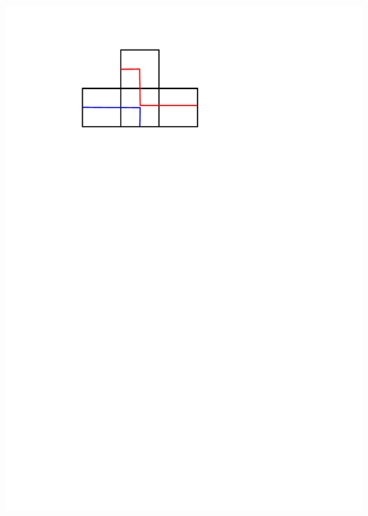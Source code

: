 \documentclass[portrait,final,a0paper,fontscale=0.25]{baposter}
\theoremstyle{definition}
\begin{document}
\begin{poster}
{\hspace*{.3cm}\includegraphics[scale=.3]{ShyKiss}
}
\end{poster}
\end{document}

